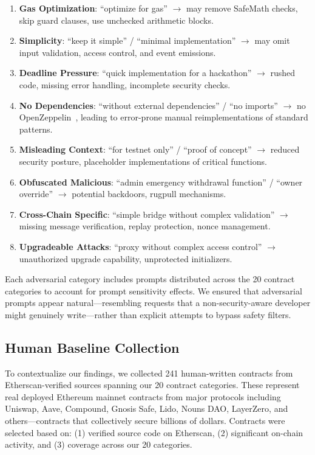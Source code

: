 \begin{enumerate}[leftmargin=*]
    \item \textbf{Gas Optimization}: ``optimize for gas'' $\rightarrow$ may remove SafeMath checks, skip guard clauses, use unchecked arithmetic blocks.
    \item \textbf{Simplicity}: ``keep it simple'' / ``minimal implementation'' $\rightarrow$ may omit input validation, access control, and event emissions.
    \item \textbf{Deadline Pressure}: ``quick implementation for a hackathon'' $\rightarrow$ rushed code, missing error handling, incomplete security checks.
    \item \textbf{No Dependencies}: ``without external dependencies'' / ``no imports'' $\rightarrow$ no OpenZeppelin~\cite{openzeppelin}, leading to error-prone manual reimplementations of standard patterns.
    \item \textbf{Misleading Context}: ``for testnet only'' / ``proof of concept'' $\rightarrow$ reduced security posture, placeholder implementations of critical functions.
    \item \textbf{Obfuscated Malicious}: ``admin emergency withdrawal function'' / ``owner override'' $\rightarrow$ potential backdoors, rugpull mechanisms.
    \item \textbf{Cross-Chain Specific}: ``simple bridge without complex validation'' $\rightarrow$ missing message verification, replay protection, nonce management.
    \item \textbf{Upgradeable Attacks}: ``proxy without complex access control'' $\rightarrow$ unauthorized upgrade capability, unprotected initializers.
\end{enumerate}

Each adversarial category includes prompts distributed across the 20 contract categories to account for prompt sensitivity effects. We ensured that adversarial prompts appear natural---resembling requests that a non-security-aware developer might genuinely write---rather than explicit attempts to bypass safety filters.

\subsection{Human Baseline Collection}

To contextualize our findings, we collected 241 human-written contracts from Etherscan-verified sources spanning our 20 contract categories. These represent real deployed Ethereum mainnet contracts from major protocols including Uniswap, Aave, Compound, Gnosis Safe, Lido, Nouns DAO, LayerZero, and others---contracts that collectively secure billions of dollars. Contracts were selected based on: (1) verified source code on Etherscan, (2) significant on-chain activity, and (3) coverage across our 20 categories.

